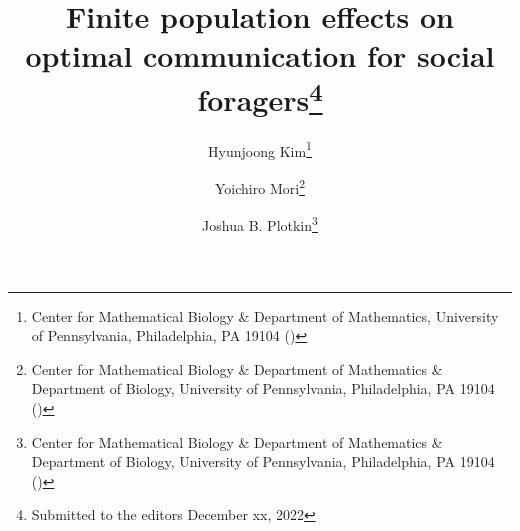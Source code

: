 

\usepackage{lipsum}
\usepackage{amsfonts}
\usepackage{graphicx}
\usepackage{epstopdf}
\usepackage{algorithmic}
\ifpdf
\else
\fi

\newcommand{\creflastconjunction}{, and~}



\title{Finite population effects on optimal communication for social foragers\thanks{Submitted to the editors December xx, 2022}}%

\author{Hyunjoong Kim\thanks{Center for Mathematical Biology \& Department of Mathematics, University of Pennsylvania, Philadelphia, PA 19104 ()} 
\and Yoichiro Mori\thanks{Center for Mathematical Biology \& Department of Mathematics \& Department of Biology, University of Pennsylvania, Philadelphia, PA 19104 ()}
\and Joshua B. Plotkin\thanks{Center for Mathematical Biology \& Department of Mathematics \& Department of Biology, University of Pennsylvania, Philadelphia, PA 19104 ()}}

\usepackage{amsopn}
\DeclareMathOperator{\diag}{diag}


\makeatletter
\newcommand*{\addFileDependency}[1]{%
  \typeout{(#1)}%
  \@addtofilelist{#1}%
  \IfFileExists{#1}{}{\typeout{No file #1.}}%
}
\makeatother


